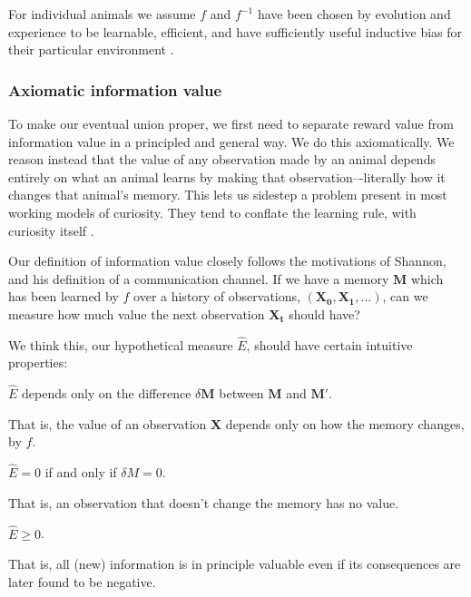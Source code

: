 For individual animals we assume $f$ and $f^{-1}$ have been chosen by evolution and experience to be learnable, efficient, and have sufficiently useful inductive bias for their particular environment \cite{Valiant1984a,Thrun1992a}. 


\subsubsection*{Axiomatic information value} 
To make our eventual union proper, we first need to separate reward value from information value in a principled and general way. We do this axiomatically.
We reason instead that the value of any observation made by an animal depends entirely on what an animal learns by making that observation–-literally how it changes that animal's memory. This lets us sidestep a problem present in most working models of curiosity. They tend to conflate the learning rule, with curiosity itself \cite{Schmidhuber1991b,Oudeyer2018a,Burda2018,Zhang2013,deAbril2018,Zhou2020,Schwartenbeck2019,Wilson2014a,Lehman2011,Velez2014}.

Our definition of information value closely follows the motivations of Shannon, and his definition of a communication channel. If we have a memory $\mathbf{M}$ which has been learned by $f$ over a history of observations, $(\mathbf{X_0},\mathbf{X_1},...)$, can we measure how much value the next observation $\mathbf{X_t}$ should have? 

We think this, our hypothetical measure $\hat E$, should have certain intuitive properties:

\begin{axiom}
	$\hat E$ depends only on the difference $\delta \mathbf{M}$ between $\mathbf{M}$ and $\mathbf{M'}$.
\end{axiom}

That is, the value of an observation $\mathbf{X}$ depends only on how
the memory changes, by $f$. 

\begin{axiom}
	$\hat E = 0$ if and only if $\delta M = 0$. 
\end{axiom}

That is, an observation that doesn’t change the memory has no value.

\begin{axiom}
	$\hat E \ge 0$.
\end{axiom}

That is, all (new) information is in principle valuable even if its consequences are later found to be negative.

